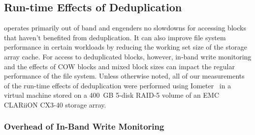 
\subsection{Run-time Effects of Deduplication}
\label{sec:run-time-overheads}

\DeDe operates primarily out of band and engenders no slowdowns for
accessing blocks that haven't benefited from deduplication. It can
also improve file system performance in certain workloads by reducing
the working set size of the storage array cache. For access to
deduplicated blocks, however, in-band write monitoring and the effects
of COW blocks and mixed block sizes can impact the regular performance
of the file system.  Unless otherwise noted, all of our measurements
of the run-time effects of deduplication
were performed using Iometer~\cite{iometer} in a virtual machine
stored on a 400~GB 5-disk RAID-5 volume of an EMC CLARiiON CX3-40
storage array.

\subsubsection{Overhead of In-Band Write Monitoring}
\label{sec:eval-sha-1}

